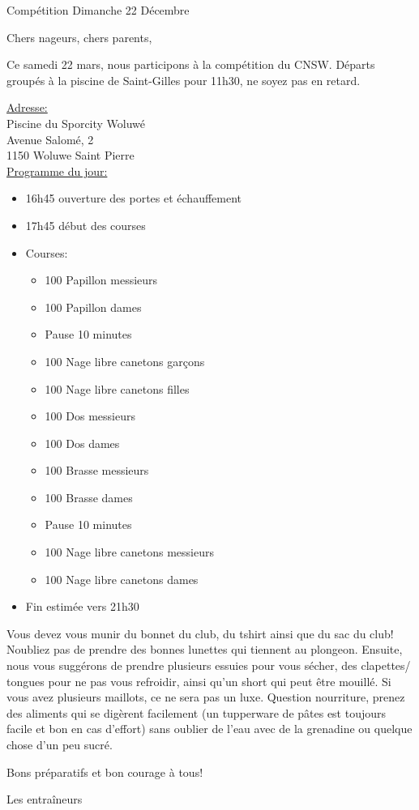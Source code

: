 \documentclass{article}
\begin{document}
\begin{center}\huge{Compétition Dimanche 22 Décembre}\end{center}
\hspace{1cm}

Chers nageurs, chers parents,

Ce samedi 22 mars, nous participons à la compétition du CNSW.
Départs groupés à la piscine de Saint-Gilles pour 11h30, ne soyez pas en retard.

\vspace{0.5cm}

\underline{Adresse:}\\
Piscine du Sporcity Woluwé\\
Avenue Salomé, 2\\
1150 Woluwe Saint Pierre\\

\underline{Programme du jour:}
\begin{itemize}
\item 16h45 ouverture des portes et échauffement
\item 17h45 début des courses
\item Courses:
\begin{itemize}
\item 100 Papillon messieurs
\item 100 Papillon dames
\item Pause 10 minutes
\item 100 Nage libre canetons garçons
\item 100 Nage libre canetons filles
\item 100 Dos messieurs
\item 100 Dos dames
\item 100 Brasse messieurs
\item 100 Brasse dames
\item Pause 10 minutes
\item 100 Nage libre canetons messieurs
\item 100 Nage libre canetons dames
\end{itemize}
\item Fin estimée vers 21h30
\end{itemize}

\vspace{1cm}

Vous devez vous munir du bonnet du club, du tshirt ainsi que du sac du club!
Noubliez pas de prendre des bonnes lunettes qui tiennent au plongeon.
Ensuite, nous vous suggérons de prendre plusieurs essuies pour vous sécher, des clapettes/ tongues pour ne pas vous refroidir, ainsi qu’un short qui peut être mouillé. Si vous avez plusieurs maillots, ce ne sera pas un luxe.
Question nourriture, prenez des aliments qui se digèrent facilement (un tupperware de pâtes est toujours facile et bon en cas d’effort) sans oublier de l’eau avec de la grenadine ou quelque chose d’un peu sucré.

Bons préparatifs et bon courage à tous!

Les entraîneurs
\end{document}
